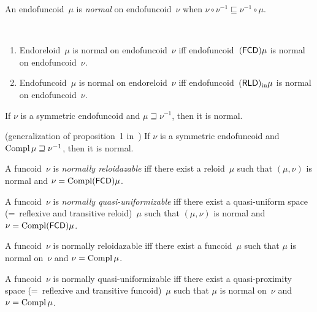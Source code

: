 \begin{defn}
An endofuncoid~$\mu$ is \emph{normal} on endofuncoid~$\nu$ when $\nu \circ \nu^{-1} \sqsubseteq \nu^{-1} \circ \mu$.
\end{defn}

\begin{obvious}\label{norm-fcd-rld}
~
\begin{enumerate}
\item Endoreloid~$\mu$ is normal on endofuncoid~$\nu$ iff endofuncoid~$(\mathsf{FCD})\mu$ is normal on endofuncoid~$\nu$.
\item Endofuncoid~$\mu$ is normal on endoreloid~$\nu$ iff endofuncoid~$(\mathsf{RLD})_{\mathrm{in}}\mu$ is normal on endofuncoid~$\nu$.
\end{enumerate}
\end{obvious}

\begin{cor}
If $\nu$ is a symmetric endofuncoid and $\mu\sqsupseteq \nu^{-1}$, then it is normal.
\end{cor}

\begin{cor} (generalization of proposition~1 in~\cite{2014arXiv1410.1504B})
If $\nu$ is a symmetric endofuncoid and $\operatorname{Compl}\mu\sqsupseteq \nu^{-1}$, then it is normal.
\end{cor}

\begin{defn}
A funcoid~$\nu$ is \emph{normally reloidazable} iff there exist a reloid~$\mu$ such that
$(\mu,\nu)$ is normal and $\nu=\operatorname{Compl}(\mathsf{FCD})\mu$.
\end{defn}

\begin{defn}
A funcoid~$\nu$ is \emph{normally quasi-uniformizable} iff there exist a quasi-uniform space (=~reflexive and transitive reloid)~$\mu$ such that
$(\mu,\nu)$ is normal and $\nu=\operatorname{Compl}(\mathsf{FCD})\mu$.
\end{defn}

\begin{prop}
A funcoid~$\nu$ is normally reloidazable iff there exist a funcoid~$\mu$ such that
$\mu$ is normal on~$\nu$ and $\nu=\operatorname{Compl}\mu$.
\end{prop}

\begin{prop}
A funcoid~$\nu$ is normally quasi-uniformizable iff there exist a quasi-proximity space (=~reflexive and transitive funcoid)~$\mu$ such that
$\mu$ is normal on~$\nu$ and $\nu=\operatorname{Compl}\mu$.
\end{prop}

